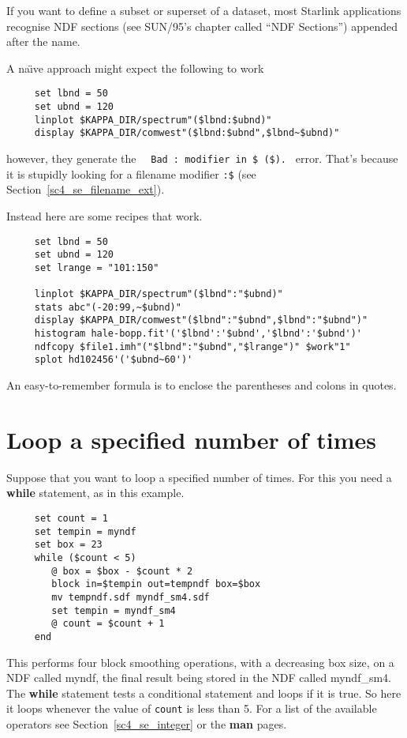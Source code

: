 \documentclass[twoside,11pt]{article}
\newcommand{\htmlref}[2]{#1}
\newcommand{\latex}[1]{#1}
\newcommand{\xref}[3]{#1}
\newcommand{\xlabel}[1]{}
\newcommand{\latexelsehtml}[2]{#1}
\newcommand{\latexelsehtml}[2]{#2}
\newcommand{\NDFref}[1]{\xref{#1}{sun33}{}}
\begin{document}
If you want to define a subset or superset of a dataset, most Starlink
applications recognise \xref{{\sf NDF sections}}{sun95}{se_ndfsect}
\latex{(see SUN/95's chapter called ``NDF Sections'')}
appended after the name.

A na\"{\i}ve approach might expect the following to work

\small
\begin{verbatim}
     set lbnd = 50
     set ubnd = 120
     linplot $KAPPA_DIR/spectrum"($lbnd:$ubnd)"
     display $KAPPA_DIR/comwest"($lbnd:$ubnd",$lbnd~$ubnd)"
\end{verbatim}
\normalsize
however, they generate the ~~{\tt Bad : modifier in \$ (\$).}~ error.
That's because it is stupidly looking for a \htmlref{filename
modifier}{sc4_se_filename_ext} {\tt :\$}\latex{ (see
Section~\ref{sc4_se_filename_ext})}.

Instead here are some recipes that work.

\small
\begin{verbatim}
     set lbnd = 50
     set ubnd = 120
     set lrange = "101:150"

     linplot $KAPPA_DIR/spectrum"($lbnd":"$ubnd)"
     stats abc"(-20:99,~$ubnd)"
     display $KAPPA_DIR/comwest"($lbnd":"$ubnd",$lbnd":"$ubnd")"
     histogram hale-bopp.fit'('$lbnd':'$ubnd','$lbnd':'$ubnd')'
     ndfcopy $file1.imh"("$lbnd":"$ubnd","$lrange")" $work"1"
     splot hd102456'('$ubnd~60')'
\end{verbatim}
\normalsize
An easy-to-remember formula is to enclose the parentheses and colons
in quotes.

\newpage
\section{\xlabel{sc4_se_loop_times}Loop a specified number of times
\label{sc4_se_loop_times}}
Suppose that you want to loop a specified number of times.  For this
you need a {\bf while} statement, as in this example.

\small
\begin{verbatim}
     set count = 1
     set tempin = myndf
     set box = 23
     while ($count < 5)
        @ box = $box - $count * 2
        block in=$tempin out=tempndf box=$box
        mv tempndf.sdf myndf_sm4.sdf
        set tempin = myndf_sm4
        @ count = $count + 1
     end
\end{verbatim}
\normalsize
This performs four block smoothing operations, with a decreasing box
size, on a \NDFref{{\sf NDF}} called myndf, the final result being
stored in the NDF called myndf\_sm4.  The {\bf while} statement tests
a conditional statement and loops if it is true.  So here it loops
whenever the value of {\tt count} is less than 5.
\latexelsehtml{For a list of the available operators
see Section~\ref{sc4_se_integer} or the {\bf man}
pages.}{Click \htmlref{here}{sc4_se_integer} to see examples of other
operators.}
\end{document}

